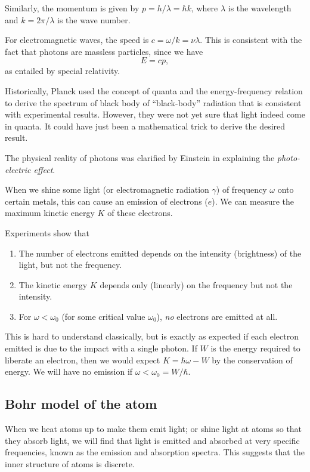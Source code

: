 \documentclass[a4paper]{article}
\begin{document}
Similarly, the momentum is given by $p = h/\lambda = \hbar k$, where $\lambda$ is the wavelength and $k = 2\pi/\lambda$ is the wave number.

For electromagnetic waves, the speed is $c = \omega/k = \nu\lambda$. This is consistent with the fact that photons are massless particles, since we have
\[
  E = cp,
\]
as entailed by special relativity.

Historically, Planck used the concept of quanta and the energy-frequency relation to derive the spectrum of black body of ``black-body'' radiation that is consistent with experimental results. However, they were not yet sure that light indeed come in quanta. It could have just been a mathematical trick to derive the desired result.

The physical reality of photons was clarified by Einstein in explaining the \emph{photo-electric effect}.

When we shine some light (or electromagnetic radiation $\gamma$) of frequency $\omega$ onto certain metals, this can cause an emission of electrons ($e$). We can measure the maximum kinetic energy $K$ of these electrons.
\begin{center}
\end{center}
Experiments show that
\begin{enumerate}
  \item The number of electrons emitted depends on the intensity (brightness) of the light, but not the frequency.
  \item The kinetic energy $K$ depends only (linearly) on the frequency but not the intensity.
  \item For $\omega < \omega_0$ (for some critical value $\omega_0$), \emph{no} electrons are emitted at all.
\end{enumerate}
This is hard to understand classically, but is exactly as expected if each electron emitted is due to the impact with a single photon. If $W$ is the energy required to liberate an electron, then we would expect $K = \hbar \omega - W$ by the conservation of energy. We will have no emission if $\omega < \omega_0 = W/\hbar$.

\subsection{Bohr model of the atom}
When we heat atoms up to make them emit light; or shine light at atoms so that they absorb light, we will find that light is emitted and absorbed at very specific frequencies, known as the emission and absorption spectra. This suggests that the inner structure of atoms is discrete.
\end{document}

